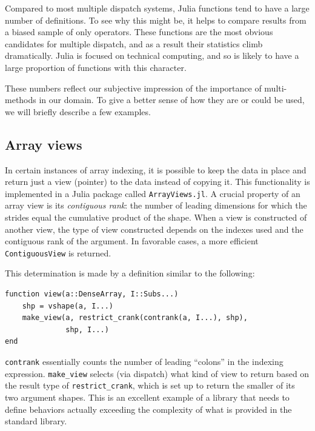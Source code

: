 \documentclass[preprint]{sigplanconf}
\newcommand{\code}[1]{\texttt{#1}}
\begin{document}
Compared to most multiple dispatch systems, Julia functions tend to have a large
number of definitions. To see why this might be, it helps to compare results
from a biased sample of only operators. These functions are the most obvious
candidates for multiple dispatch, and as a result their statistics climb
dramatically. Julia is focused on technical computing, and so is likely to
have a large proportion of functions with this character.

These numbers reflect our subjective impression of the importance of
multi-methods in our domain. To give a better sense of how they
are or could be used, we will briefly describe a few examples.

\subsection{Array views}

In certain instances of array indexing, it is
possible to keep the data in place and return just a view (pointer) to the
data instead of copying it. This functionality is implemented in a Julia
package called \code{ArrayViews.jl}\cite{Lin:2014av}. A crucial property
of an array view is its \emph{contiguous rank}: the number of leading
dimensions for which the strides equal the cumulative product of the shape.
When a view is constructed of another view, the type of view constructed
depends on the indexes used and the contiguous rank of the argument. In
favorable cases, a more efficient \code{ContiguousView} is returned.

This determination is made by a definition similar to the following:

\begin{minipage}{\linewidth}
{\small
\begin{verbatim}
function view(a::DenseArray, I::Subs...)
    shp = vshape(a, I...)
    make_view(a, restrict_crank(contrank(a, I...), shp),
              shp, I...)
end

\end{verbatim}
}
\end{minipage}

\code{contrank} essentially counts the number of leading ``colons'' in the
indexing expression. \code{make\_view} selects (via dispatch) what kind of
view to return based on the result type of \code{restrict\_crank}, which is
set up to return the smaller of its two argument shapes.
This is an excellent example of a library that needs to define behaviors
actually exceeding the complexity of what is provided in the standard library.
\end{document}
